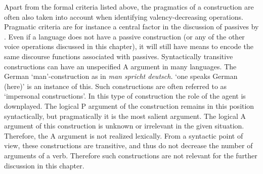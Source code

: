 Apart from the formal criteria listed above, the pragmatics of a construction are often also taken into account when identifying valency-decreasing operations.
Pragmatic criteria are for instance a central factor in the discussion of passives by \citet{Passives}. 
Even if a language does not have a passive construction (or any of the other voice operations discussed in this chapter), it will still have means to encode the same discourse functions associated with passives.
Syntactically transitive constructions can have an unspecified A argument in many languages.
The German `man'-construction as in \emph{man spricht deutsch.}  `one speaks German (here)' is an instance of this.
Such constructions are often referred to as `impersonal constructions'.
In this type of construction the role of the agent is downplayed. 
The logical P argument of the construction remains in this position syntactically, but pragmatically it is the most salient argument. 
The logical A argument of this construction is unknown or irrelevant in the given situation. 
Therefore, the A argument is not realized lexically. 
From a syntactic point of view, these constructions are transitive, and thus do not decrease the number of arguments of a verb.
Therefore such constructions are not relevant for the further discussion in this chapter.  

 



